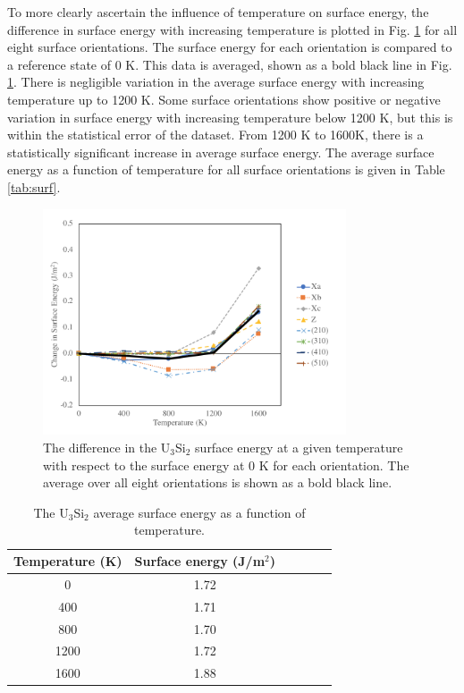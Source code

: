 \documentclass[review]{elsarticle}
\begin{document}
To more clearly ascertain the influence of temperature on surface energy, the difference in surface energy with increasing temperature is plotted in Fig. \ref{fig:deltasurf} for all eight surface orientations. The surface energy for each orientation is compared to a reference state of 0 K. This data is averaged, shown as a bold black line in Fig. \ref{fig:deltasurf}. There is negligible variation in the average surface energy with increasing temperature up to 1200 K. Some surface orientations show positive or negative variation in surface energy with increasing temperature below 1200 K, but this is within the statistical error of the dataset. From 1200 K to 1600K, there is a statistically significant increase in average surface energy. The average surface energy as a function of temperature for all surface orientations is given in Table \ref{tab:surf}. 

\begin{figure}[h]
 \centering
 \includegraphics[width=0.8\textwidth]{deltasurfvsT.png} 
 \caption{The difference in the U$_{3}$Si$_{2}$ surface energy at a given temperature with respect to the surface energy at 0 K for each orientation. The average over all eight orientations is shown as a bold black line. }
 \label{fig:deltasurf}
\end{figure}

\begin{table}[h]
\caption{The U$_{3}$Si$_{2}$ average surface energy as a function of temperature.} \label{tab:surf}
\begin{center}
\begin{tabular}{|c|c|c|c|c|c|}
	\hline
	Temperature (K) & Surface energy (J/m$^{2}$)\\
	 \hline
	 0 & 1.72	 \\
	 400 & 1.71 \\
	 800 & 1.70	 \\
	 1200 & 1.72 \\
	 1600 & 1.88 \\
	 \hline
\end{tabular}
\end{center}
\label{default}
\end{table}
\end{document}
